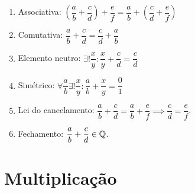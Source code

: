 \documentclass[../main.tex]{subfiles}
\begin{document}
\begin{dem}
    \begin{enumerate}[label=(\roman*)]
        \item Associativa: 
            $\left( \dfrac{a}{b} + \dfrac{c}{d}\right) + \dfrac{e}{f} = 
            \dfrac{a}{b} + \left(\dfrac{c}{d} + \dfrac{e}{f}\right)$
        
        \item Comutativa: $\dfrac{a}{b} + \dfrac{c}{d} = \dfrac{c}{d} + \dfrac{a}{b}$
        
        \item Elemento neutro: $\exists! \dfrac{x}{y} : \dfrac{x}{y} + \dfrac{c}{d} =     \dfrac{c}{d}$
        
        \item Simétrico: $\forall \dfrac{a}{b} \exists! \dfrac{x}{y} :  \dfrac{a}{b} + \dfrac{x}{y} = \dfrac{0}{1}$
        
        \item Lei do cancelamento:
            $\dfrac{a}{b} + \dfrac{c}{d} = \dfrac{a}{b} + \dfrac{e}{f} \implies \dfrac{c}{d} = \dfrac{e}{f}$.
            
        \item Fechamento:
        $\dfrac{a}{b} + \dfrac{c}{d} \in \mathbb{Q}$.
    \end{enumerate}    
\end{dem}


\section{Multiplicação}
\end{document}
